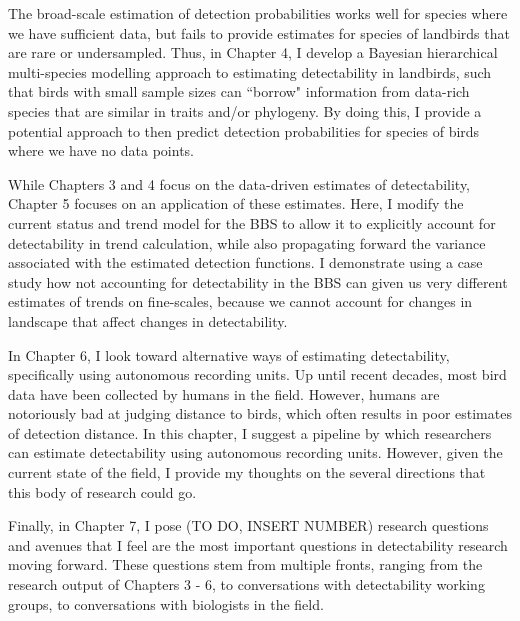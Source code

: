 \par The broad-scale estimation of detection probabilities works well for species where we have sufficient data, but fails to provide estimates for species of landbirds that are rare or undersampled.
Thus, in Chapter 4, I develop a Bayesian hierarchical multi-species modelling approach to estimating detectability in landbirds, such that birds with small sample sizes can ``borrow" information from data-rich species that are similar in traits and/or phylogeny.
By doing this, I provide a potential approach to then predict detection probabilities for species of birds where we have no data points.

\par While Chapters 3 and 4 focus on the data-driven estimates of detectability, Chapter 5 focuses on an application of these estimates.
Here, I modify the current status and trend model for the BBS \citep{smith_spatially_2023} to allow it to explicitly account for detectability in trend calculation, while also propagating forward the variance associated with the estimated detection functions.
I demonstrate using a case study how not accounting for detectability in the BBS can given us very different estimates of trends on fine-scales, because we cannot account for changes in landscape that affect changes in detectability.

\par In Chapter 6, I look toward alternative ways of estimating detectability, specifically using autonomous recording units.
Up until recent decades, most bird data have been collected by humans in the field.
However, humans are notoriously bad at judging distance to birds, which often results in poor estimates of detection distance.
In this chapter, I suggest a pipeline by which researchers can estimate detectability using autonomous recording units.
However, given the current state of the field, I provide my thoughts on the several directions that this body of research could go.

\par Finally, in Chapter 7, I pose (TO DO, INSERT NUMBER) research questions and avenues that I feel are the most important questions in detectability research moving forward.
These questions stem from multiple fronts, ranging from the research output of Chapters 3 - 6, to conversations with detectability working groups, to conversations with biologists in the field.

